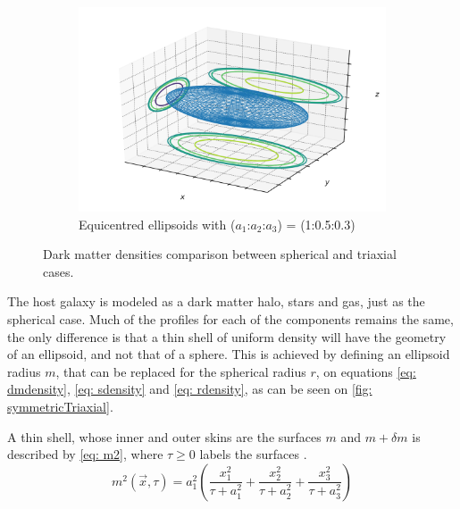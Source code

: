 \begin{figure}[h]
\begin{subfigure}[t]{0.6\textwidth}
				\includegraphics[width=\textwidth]{"../Files/Week 7/ellipsoid_"}
				\caption{Equicentred ellipsoids with ($a_1$:$a_2$:$a_3$) = (1:0.5:0.3)}
			\end{subfigure}
			\caption{Dark matter densities comparison between spherical and triaxial cases.}
			\label{fig: symmetricTriaxial}
		\end{figure}
	
		The host galaxy is modeled as a dark matter halo, stars and gas, just as the spherical case. Much of the profiles for each of the components remains the same, the only difference is that a thin shell of uniform density will have the geometry of an ellipsoid, and not that of a sphere. This is achieved by defining an ellipsoid radius $m$, that can be replaced for the spherical radius $r$, on equations \ref{eq: dmdensity}, \ref{eq: sdensity} and \autoref{eq: rdensity}, as can be seen on \autoref{fig: symmetricTriaxial}. 
		
		A thin shell, whose inner and outer skins are the surfaces $m$ and $m + \delta m$ is described by \autoref{eq: m2}, where $\tau \geq 0$ labels the surfaces \cite{binney2011galactic}.
		\begin{equation}\label{eq: m2}
		m^2(\vec{x}, \tau) = a_1^2\left(\frac{x_1^{2}}{\tau + a_{1}^{2}} + \frac{x_2^{2}}{\tau + a_{2}^{2}} + \frac{x_3^{2}}{\tau + a_{3}^{2}}\right)
		\end{equation}
		
